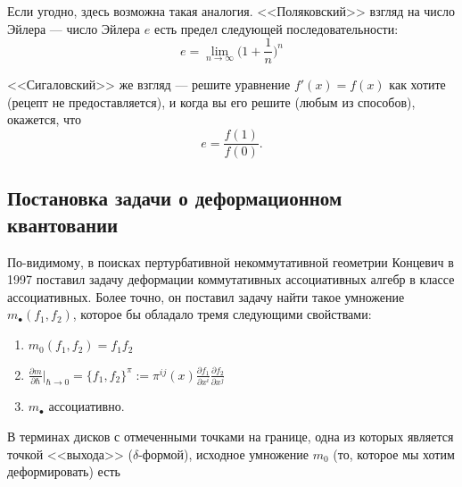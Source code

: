 \documentclass[11pt]{article}
\def\p{\partial}
\theoremstyle{remark}
\theoremstyle{definition}
\begin{document}
\footnotesize{}

Если угодно, здесь возможна такая аналогия. <<Поляковский>> взгляд на число Эйлера --- число Эйлера $e$ есть предел следующей последовательности: $$e = \lim\limits_{n \to \infty} \Big(1 + \frac{1}{n} \Big)^n$$

<<Сигаловский>> же взгляд --- решите уравнение $f'(x) = f(x)$ как хотите (рецепт не предоставляется), и когда вы его решите (любым из способов), окажется, что $$e = \frac{f(1)}{f(0)}.$$

\normalsize{}

\subsection{Постановка задачи о деформационном квантовании}



По-видимому, в поисках пертурбативной некоммутативной геометрии Концевич в 1997 поставил задачу деформации коммутативных ассоциативных алгебр в классе ассоциативных. Более точно, он поставил задачу найти такое умножение $m_{\bullet} (f_1, f_2)$, которое бы обладало тремя следующими свойствами:

\begin{enumerate}
  \item $m_0 (f_1, f_2) = f_1 f_2$
  \item $\frac{\partial m}{\partial \hbar}\Bigg|_{\hbar \to 0} = \{ f_1, f_2\}^{\pi} := \pi^{ij} (x) \frac{\p f_1}{\p x^i} \frac{\p f_2}{\p x^j}$
  \item $m_{\bullet}$ ассоциативно.
\end{enumerate}


В терминах дисков с отмеченными точками на границе, одна из которых является точкой <<выхода>> ($\delta$-формой), исходное умножение $m_0$ (то, которое мы хотим деформировать) есть
\end{document}
